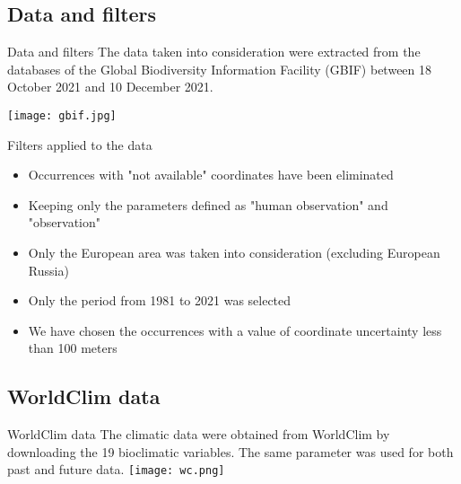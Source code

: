\documentclass{beamer}
\begin{document}
\subsection{Data and filters}
\begin{frame}{Data and filters}
    The data taken into consideration were extracted from the databases of the Global Biodiversity Information Facility (GBIF) between 18 October 2021 and 10 December 2021.
    \bigskip
    
    \centering
    \texttt{[image: gbif.jpg]}
\end{frame}
\begin{frame}{Filters applied to the data}
\begin{itemize}
    \item Occurrences with "not available" coordinates have been eliminated \pause
    \item Keeping only the parameters defined as "human observation" and "observation" \pause
    \item Only the European area was taken into consideration (excluding European Russia) \pause
    \item Only the period from 1981 to 2021 was selected \pause
    \item We have chosen the occurrences with a value of coordinate uncertainty less than 100 meters
\end{itemize}
\end{frame}

\subsection{WorldClim data}
\begin{frame}{WorldClim data}
    The climatic data were obtained from WorldClim by downloading the 19 bioclimatic variables.
    The same parameter was used for both past and future data.
    \centering
    \texttt{[image: wc.png]}
\end{frame}
\end{document}
